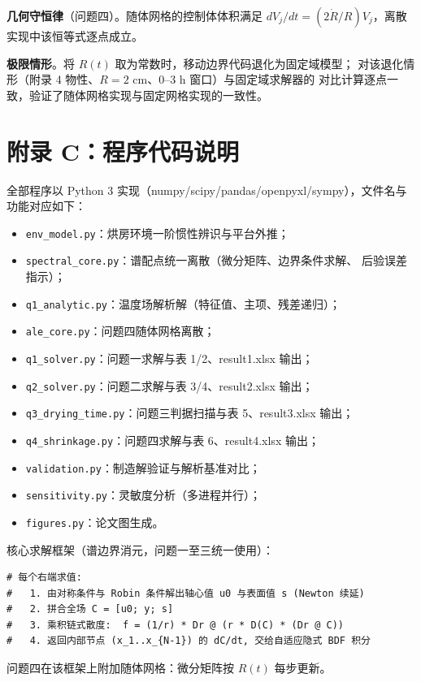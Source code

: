 \textbf{几何守恒律}（问题四）。随体网格的控制体体积满足
$dV_j/dt=(2\dot R/R)V_j$，离散实现中该恒等式逐点成立。

\textbf{极限情形}。将 $R(t)$ 取为常数时，移动边界代码退化为固定域模型；
对该退化情形（附录 4 物性、$R=2$ cm、$0$--$3$ h 窗口）与固定域求解器的
对比计算逐点一致，验证了随体网格实现与固定网格实现的一致性。

\section{附录 C：程序代码说明}

全部程序以 Python 3 实现（numpy/scipy/pandas/openpyxl/sympy），文件名与
功能对应如下：

\begin{itemize}
\item \texttt{env\_model.py}：烘房环境一阶惯性辨识与平台外推；
\item \texttt{spectral\_core.py}：谱配点统一离散（微分矩阵、边界条件求解、
后验误差指示）；
\item \texttt{q1\_analytic.py}：温度场解析解（特征值、主项、残差递归）；
\item \texttt{ale\_core.py}：问题四随体网格离散；
\item \texttt{q1\_solver.py}：问题一求解与表 1/2、result1.xlsx 输出；
\item \texttt{q2\_solver.py}：问题二求解与表 3/4、result2.xlsx 输出；
\item \texttt{q3\_drying\_time.py}：问题三判据扫描与表 5、result3.xlsx 输出；
\item \texttt{q4\_shrinkage.py}：问题四求解与表 6、result4.xlsx 输出；
\item \texttt{validation.py}：制造解验证与解析基准对比；
\item \texttt{sensitivity.py}：灵敏度分析（多进程并行）；
\item \texttt{figures.py}：论文图生成。
\end{itemize}

核心求解框架（谱边界消元，问题一至三统一使用）：

\begin{verbatim}
# 每个右端求值:
#   1. 由对称条件与 Robin 条件解出轴心值 u0 与表面值 s (Newton 续延)
#   2. 拼合全场 C = [u0; y; s]
#   3. 乘积链式散度:  f = (1/r) * Dr @ (r * D(C) * (Dr @ C))
#   4. 返回内部节点 (x_1..x_{N-1}) 的 dC/dt, 交给自适应隐式 BDF 积分
\end{verbatim}

问题四在该框架上附加随体网格：微分矩阵按 $R(t)$ 每步更新。
